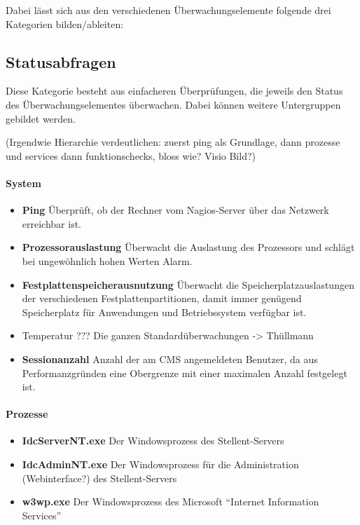 Dabei lässt sich aus den verschiedenen Überwachungselemente folgende drei Kategorien bilden/ableiten:

\subsection{Statusabfragen}
Diese Kategorie besteht aus einfacheren Überprüfungen, die jeweils den Status des Überwachungselementes überwachen.
Dabei können weitere Untergruppen gebildet werden.

(Irgendwie Hierarchie verdeutlichen: zuerst ping als Grundlage, dann prozesse und services dann funktionschecks, bloss wie? Visio Bild?)

\paragraph{System}
\begin{itemize}
\item \textbf{Ping} Überprüft, ob der Rechner vom Nagios-Server über das Netzwerk erreichbar ist.
\item \textbf{Prozessorauslastung} Überwacht die Auslastung des Prozessors und schlägt bei ungewöhnlich hohen Werten Alarm.
\item \textbf{Festplattenspeicherausnutzung} Überwacht die Speicherplatzauslastungen der verschiedenen Festplattenpartitionen, damit immer genügend Speicherplatz für Anwendungen und Betriebssystem verfügbar ist.
\item Temperatur ??? Die ganzen Standardüberwachungen -> Thüllmann
\item \textbf{Sessionanzahl} Anzahl der am CMS angemeldeten Benutzer, da aus Performanzgründen eine Obergrenze mit einer maximalen Anzahl festgelegt ist.
\end{itemize}

\paragraph{Prozesse}
\begin{itemize}
\item \textbf{IdcServerNT.exe} Der Windowsprozess des Stellent-Servers
\item \textbf{IdcAdminNT.exe} Der Windowsprozess für die Administration (Webinterface?) des Stellent-Servers
\item \textbf{w3wp.exe} Der Windowsprozess des Microsoft "`Internet Information Services"'
\end{itemize}

